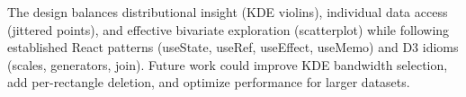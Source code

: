 \documentclass[sigplan,screen]{acmart}
\begin{document}
The design balances distributional insight (KDE violins), individual
data access (jittered points), and effective bivariate exploration
(scatterplot) while following established React patterns (useState,
useRef, useEffect, useMemo) and D3 idioms (scales, generators, join).
Future work could improve KDE bandwidth selection, add per-rectangle
deletion, and optimize performance for larger datasets.


\end{document}
